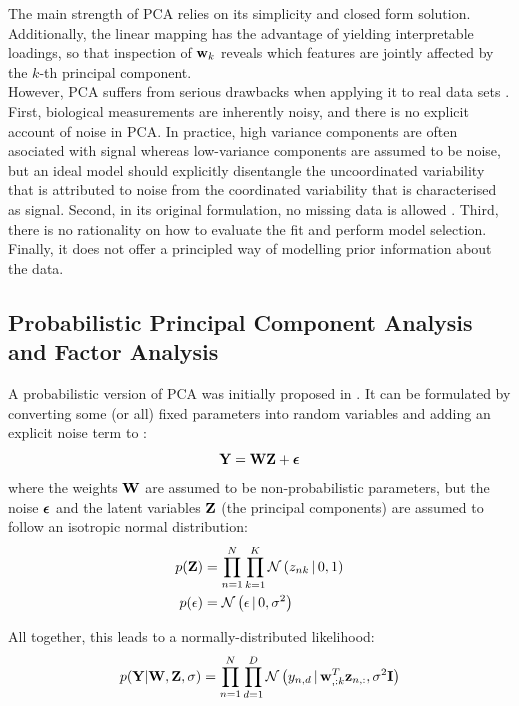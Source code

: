 The main strength of PCA relies on its simplicity and closed form solution. Additionally, the linear mapping has the advantage of yielding interpretable loadings, so that inspection of ${\bf w}_k$ reveals which features are jointly affected by the $k$-th principal component.\\
However, PCA suffers from serious drawbacks when applying it to real data sets \cite{Li2017b}. First, biological measurements are inherently noisy, and there is no explicit account of noise in PCA. In practice, high variance components are often asociated with signal whereas low-variance components are assumed to be noise, but an ideal model should explicitly disentangle the uncoordinated variability that is attributed to noise from the coordinated variability that is characterised as signal. Second, in its original formulation, no missing data is allowed \cite{Ilin2010}. Third, there is no rationality on how to evaluate the fit and perform model selection. Finally, it does not offer a principled way of modelling prior information about the data.

\subsection{Probabilistic Principal Component Analysis and Factor Analysis} \label{section:probabilistic_pca}
A probabilistic version of PCA was initially proposed in \cite{Tipping1999}. It can be formulated by converting some (or all) fixed parameters into random variables and adding an explicit noise term to :
\begin{equation}
	{\bf Y} = {\bf W} {\bf Z} + \mbox{\boldmath $\epsilon$}
\end{equation}
where the weights ${\bf W}$ are assumed to be non-probabilistic parameters, but the noise $\mbox{\boldmath $\epsilon$}$ and the latent variables ${\bf Z}$ (the principal components) are assumed to follow an isotropic normal distribution:
\begin{align*}
	p({\bf Z}) &= \prod_{n=1}^{N} \prod_{k=1}^{K} \mathcal{N}\left(z_{nk} \,|\, 0,1\right) \\
	p(\epsilon) &= \mathcal{N}\left(\epsilon \,|\, 0,\sigma^2\right)
\end{align*}

All together, this leads to a normally-distributed likelihood:
\begin{equation} \label{eq:ppca_lik}
	p({\bf Y}|{\bf W},{\bf Z},\sigma) = \prod_{n=1}^{N} \prod_{d=1}^{D} \mathcal{N}\left(y_{n,d} \,|\, {\bf w}_{,:k}^T {\bf z}_{n,:},\sigma^2 {\bf I}\right)
\end{equation}

